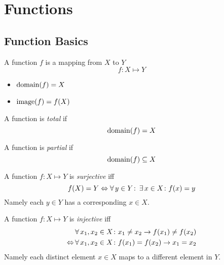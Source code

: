 \chapter{Functions}

\section{Function Basics}

\begin{definition}[Function]
    A function $f$ is a mapping from $X$ to $Y$
    \begin{equation}
        f \colon X \mapsto Y
    \end{equation}
    \begin{itemize}
        \item $\operatorname{domain}({f}) = X$
        \item $\operatorname{image}({f}) = f(X)$
    \end{itemize}
\end{definition}

\begin{definition}
    A function is \textit{total} if
    \begin{equation}
        \operatorname{domain}({f}) = X
    \end{equation}
\end{definition}

\begin{definition}
    A function is \textit{partial} if
    \begin{equation}
        \operatorname{domain}({f}) \subseteq X
    \end{equation}
\end{definition}

\begin{definition}[Surjection]
    A function $f \colon X \mapsto Y$ is \textit{surjective} iff
    \begin{equation}
        f(X) = Y \Leftrightarrow \operatorname{\forall} y \in Y \colon \operatorname{\exists} x \in X \colon f(x) = y
    \end{equation}
    Namely each $y \in Y$ has a corresponding $x \in X$.
\end{definition}

\begin{definition}
    A function $f \colon X \mapsto Y$ is \textit{injective} iff
    \begin{align}
        &\operatorname{\forall} x_1, x_2 \in X \colon x_1 \neq x_2 \to f(x_1) \neq f(x_2) \\
        \Leftrightarrow &\operatorname{\forall} x_1, x_2 \in X \colon f(x_1) = f(x_2) \to x_1 = x_2
    \end{align}
    Namely each distinct element $x \in X$ maps to a different element in $Y$.
\end{definition}

